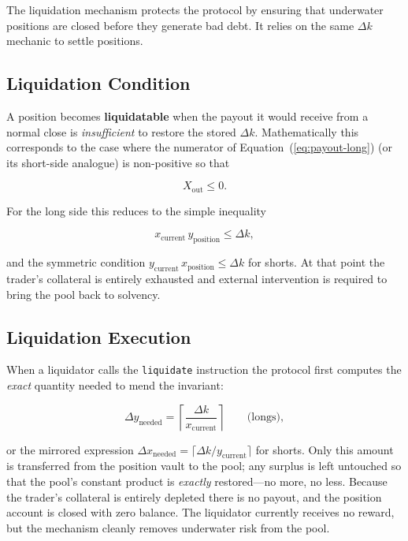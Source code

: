\documentclass[11pt]{article}
\begin{document}
The liquidation mechanism protects the protocol by ensuring that underwater positions are closed before they generate bad debt. It relies on the same $\Delta k$ mechanic to settle positions.

\subsection{Liquidation Condition}

A position becomes \textbf{liquidatable} when the payout it would receive from a normal close is \emph{insufficient} to restore the stored $\Delta k$. Mathematically this corresponds to the case where the numerator of Equation~(\ref{eq:payout-long}) (or its short-side analogue) is non-positive so that

\begin{equation}
X_{\text{out}} \le 0 .
\end{equation}

For the long side this reduces to the simple inequality

\begin{equation}
x_{\text{current}}\,y_{\text{position}} \le \Delta k ,
\end{equation}

and the symmetric condition $y_{\text{current}}\,x_{\text{position}} \le \Delta k$ for shorts. At that point the trader's collateral is entirely exhausted and external intervention is required to bring the pool back to solvency.

\subsection{Liquidation Execution}

When a liquidator calls the \texttt{liquidate} instruction the protocol first computes the \emph{exact} quantity needed to mend the invariant:

\begin{equation}
\Delta y_{\text{needed}} = \left\lceil \frac{\Delta k}{x_{\text{current}}} \right\rceil \qquad\text{(longs)},
\end{equation}

or the mirrored expression $\Delta x_{\text{needed}} = \lceil \Delta k / y_{\text{current}} \rceil$ for shorts. Only this amount is transferred from the position vault to the pool; any surplus is left untouched so that the pool's constant product is \emph{exactly} restored—no more, no less. Because the trader's collateral is entirely depleted there is no payout, and the position account is closed with zero balance. The liquidator currently receives no reward, but the mechanism cleanly removes underwater risk from the pool.
\end{document}
